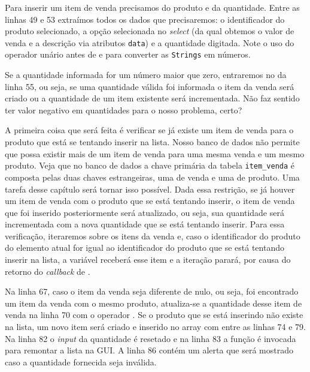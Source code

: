 Para inserir um item de venda precisamos do produto e da quantidade. Entre as linhas 49 e 53 extraímos todos os dados que precisaremos: o identificador do produto selecionado, a opção selecionada no \textit{select} (da qual obtemos o valor de venda e a descrição via atributos \texttt{data}) e a quantidade digitada. Note o uso do operador unário \inlineJavaScriptCode{+} antes de  e  para converter as \texttt{Strings} em números.

Se a quantidade informada for um número maior que zero, entraremos no  da linha 55, ou seja, se uma quantidade válida foi informada o item da venda será criado ou a quantidade de um item existente será incrementada. Não faz sentido ter valor negativo em quantidades para o nosso problema, certo?

A primeira coisa que será feita é verificar se já existe um item de venda para o produto que está se tentando inserir na lista. Nosso banco de dados não permite que possa existir mais de um item de venda para uma mesma venda e um mesmo produto. Veja que no banco de dados a chave primária da tabela \texttt{item\_venda} é composta pelas duas chaves estrangeiras, uma de venda e uma de produto. Uma tarefa desse capítulo será tornar isso possível. Dada essa restrição, se já houver um item de venda com o produto que se está tentando inserir, o item de venda que foi inserido posteriormente será atualizado, ou seja, sua quantidade será incrementada com a nova quantidade que se está tentando inserir. Para essa verificação, iteraremos sobre os itens da venda e, caso o identificador do produto do elemento atual for igual ao identificador do produto que se está tentando inserir na lista, a variável  receberá esse item e a iteração parará, por causa do retorno  do \textit{callback} de .

Na linha 67, caso o item da venda seja diferente de nulo, ou seja, foi encontrado um item da venda com o mesmo produto, atualiza-se a quantidade desse item de venda na linha 70 com o operador \inlineJavaScriptCode{+=}. Se o produto que se está inserindo não existe na lista, um novo item será criado e inserido no array com  entre as linhas 74 e 79. Na linha 82 o \textit{input} da quantidade é resetado e na linha 83 a função  é invocada para remontar a lista na GUI. A linha 86 contém um alerta que será mostrado caso a quantidade fornecida seja inválida.

